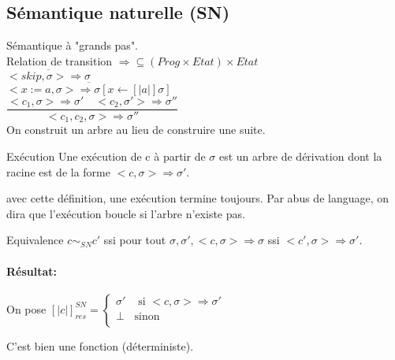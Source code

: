 \documentclass[10pt,a4paper]{article}
\newcommand{\semm}[1]{\left[| #1 | \right]}
\begin{document}
\subsection{Sémantique naturelle (SN)}
 
 Sémantique à "grands pas".\\
 Relation de transition $\Rightarrow \subseteq (Prog \times Etat) \times Etat$\\

$\overline{ <skip, \sigma > \Rightarrow \sigma }$\\

$\overline{  <x:=a , \sigma > \Rightarrow \sigma [ x \leftarrow \semm{a } \sigma ] }$\\

$\dfrac{ <c_1, \sigma > \Rightarrow \sigma' \quad <c_2 , \sigma' > \Rightarrow \sigma'' }{<c_1, c_2, \sigma > \Rightarrow \sigma''}$\\


On construit un arbre au lieu de construire une suite.
\begin{definition}{Exécution}
Une exécution de c à partir de $\sigma$ est un arbre de dérivation dont la racine est de la forme $<c, \sigma > \Rightarrow \sigma'$.\\
\end{definition} 
\begin{rem}{}
avec cette définition, une exécution termine toujours. Par abus de language, on dira que l'exécution boucle si l'arbre n'existe pas.
\end{rem}
\begin{definition}{Equivalence}
 $c \sim_{SN} c'$ ssi pour tout $\sigma, \sigma', < c, \sigma > \Rightarrow \sigma$ ssi $<c', \sigma > \Rightarrow \sigma'$.\\
\end{definition} 


\paragraph*{Résultat:}
On pose $\semm{c}_{res}^{SN} = \left\{ \begin{array}{ll}
 \sigma' &\text{ si } <c, \sigma > \Rightarrow \sigma' \\
 \perp & \text{sinon} \\
\end{array} \right.$

\begin{thm}{} C'est bien une fonction (déterministe).\\
\end{thm}
\end{document}
